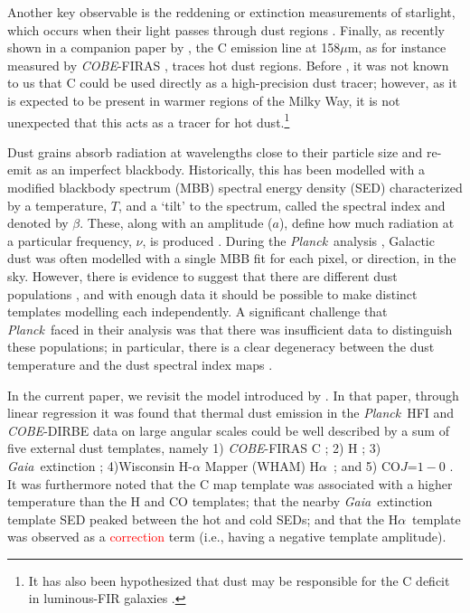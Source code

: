\documentclass{aa}
\makeatletter
\DeclareRobustCommand{\ion}[2]{%
\relax\ifmmode
\ifx\testbx\f@series
{\mathbf{#1\,\mathsc{#2}}}\else
{\mathrm{#1\,\mathsc{#2}}}\fi
\else\textup{#1\,{\mdseries\textsc{#2}}}%
\fi}
\newcommand{\mathsc}[1]{{\normalfont\textsc{#1}}}
\def\Planck{\textit{Planck}}
\def\planck{\textit{Planck}}
\def\COBE{\textit{COBE}}
\def\Gaia{\textit{Gaia}}
\def\Ha{H$\alpha$}
\def\,{\thinspace}
\newcommand{\edit}[1]{\textcolor{red}{#1}}
\makeatother
\begin{document}
Another key observable is the reddening or extinction measurements of starlight, which occurs when their light passes through dust regions \citep[e.g.,][]{lenz:2017,lallement:2022,edenhofer:2024}. Finally, as recently shown in a companion paper by \cite{CG02_05}, the \ion{C}{ii} emission line at 158\,$\mu$m, as for instance measured by \COBE-FIRAS \citep{mather:1994}, traces hot dust regions. Before \cite{CG02_05}, it was not known to us that \ion{C}{ii} could be used directly as a high-precision dust tracer; however, as it is expected to be present in warmer regions of the Milky Way, it is not unexpected that this acts as a tracer for hot dust.\footnote{It has also been hypothesized that dust may be responsible for the \ion{C}{ii} deficit in luminous-FIR galaxies \citep{2020CII,2017Herschel_FIR_CII}.} 

Dust grains absorb radiation at wavelengths close to their particle size and re-emit as an imperfect blackbody. Historically, this has been modelled with a modified blackbody spectrum (MBB) spectral energy density (SED) characterized by a temperature, $T$, and a `tilt' to the spectrum, called the spectral index and denoted by $\beta$. These, along with an amplitude ($a$), define how much radiation at a particular frequency, $\nu$, is produced \citep[see, e.g.,][for a recent review]{Hensley2023}. During the \planck\ analysis \citep[][]{planck2016-l01,planck2014-a12}, Galactic dust was often modelled with a single MBB fit for each pixel, or direction, in the sky. However, there is evidence to suggest that there are different dust populations \citep{finkbeiner1999}, and with enough data it should be possible to make distinct templates modelling each independently. A significant challenge that \planck\ faced in their analysis was that there was insufficient data to distinguish these populations; in particular, there is a clear degeneracy between the dust temperature and the dust spectral index maps \citep{juvela:2012,planck2014-a12}.

In the current paper, we revisit the model introduced by \citet{CG02_05}. In that paper, through linear regression it was found that thermal dust emission in the \Planck\ HFI \citep{planck2016-l03} and \COBE-DIRBE \citep{hauser1998} data on large angular scales could be well described by a sum of five external dust templates, namely 1) \COBE-FIRAS \ion{C}{ii} \citep{fixsen:1999}; 2) \ion{H}{i} \citep{HI4PI2016}; 3) \Gaia\ extinction \citep{edenhofer:2024}; 4)Wisconsin H-$\alpha$ Mapper (WHAM) \Ha\ \citep{wham:2003,2016WHAM}; and 5) CO\,$J$=$1-0$ \citep{dame2001}. It was furthermore noted that the \ion{C}{ii} map template was associated with a higher temperature than the \ion{H}{i}  and CO templates; that the nearby \Gaia\ extinction template SED peaked between the hot and cold SEDs; and that the \Ha\ template was observed as a \edit{correction} term (i.e., having a negative template amplitude).
\end{document}

